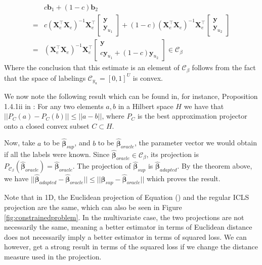 \documentclass{llncs}
\newcommand{\Nunl}{U}
\newcommand{\Xe}{\mathbf{X}_e  }
\newcommand{\XeT}{\mathbf{X}_e^{\top}}
\begin{document}
\begin{equation}
\begin{aligned}
&c \boldsymbol{b}_1 + (1-c) \boldsymbol{b}_2 \\
=&c \left( {\XeT} {\Xe} \right)^{-1} {\XeT} \begin{bmatrix} \mathbf{y}  \\ \mathbf{y}_{u_1} \end{bmatrix} + (1-c) \left( {\XeT} {\Xe} \right)^{-1} {\XeT} \begin{bmatrix} \mathbf{y}  \\ \mathbf{y}_{u_2} \end{bmatrix} \\
=&\left( {\XeT} {\Xe} \right)^{-1} {\XeT} \begin{bmatrix} \mathbf{y}  \\ c \mathbf{y}_{u_1} + (1-c) \mathbf{y}_{u_2}  \end{bmatrix} \in \mathcal{C}_{\beta}
\end{aligned}
\end{equation}
Where the conclusion that this estimate is an element of $\mathcal{C}_{\beta}$ follows from the fact that the space of labelings $\mathcal{C}_{y_u}=[0,1]^{\Nunl}$ is convex. 

We now note the following result which can be found in, for instance, Proposition 1.4.1ii in \cite[p.17]{Aubin2000}: For any two elements $a,b$ in a Hilbert space $H$ we have that $||P_C(a)-P_C(b)|| \leq ||a-b||$, where $P_C$ is the best approximation projector onto a closed convex subset $C \subset H$.

Now, take $a$ to be $\boldsymbol{\hat{\beta}}_{sup}$, and $b$ to be $\boldsymbol{\hat{\beta}}_{oracle}$, the parameter vector we would obtain if all the labels were known. Since $\boldsymbol{\hat{\beta}}_{oracle} \in \mathcal{C}_{\beta}$, its projection is $P_{\mathcal{C}_{\beta}}(\boldsymbol{\hat{\beta}}_{oracle})=\boldsymbol{\hat{\beta}}_{oracle}$. The projection of $\boldsymbol{\hat{\beta}}_{sup}$ is $\boldsymbol{\hat{\beta}}_{adapted}$. By the theorem above, we have $||\boldsymbol{\hat{\beta}}_{adapted}-\boldsymbol{\hat{\beta}}_{oracle}|| \leq ||\boldsymbol{\hat{\beta}}_{sup}-\boldsymbol{\hat{\beta}}_{oracle}||$ which proves the result.

Note that in 1D, the Euclidean projection of Equation () and the regular ICLS projection are the same, which can also be seen in Figure \ref{fig:constrainedproblem}. In the multivariate case, the two projections are not necessarily the same, meaning a better estimator in terms of Euclidean distance does not necessarily imply a better estimator in terms of squared loss. We can however, get a strong result in terms of the squared loss if we change the distance measure used in the projection.
\end{document}
